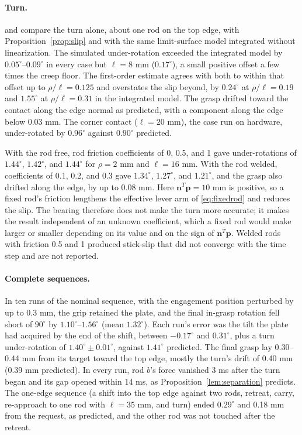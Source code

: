 

\paragraph{Turn.}
 and  compare the turn alone, about one rod on the top edge, with Proposition~\ref{prop:slip} and with the same limit-surface model integrated without linearization. The simulated under-rotation exceeded the integrated model by $0.05^{\circ}$--$0.09^{\circ}$ in every case but $\ell=8$ mm ($0.17^{\circ}$), a small positive offset a few times the creep floor. The first-order estimate agrees with both to within that offset up to $\rho/\ell=0.125$ and overstates the slip beyond, by $0.24^{\circ}$ at $\rho/\ell=0.19$ and $1.55^{\circ}$ at $\rho/\ell=0.31$ in the integrated model. The grasp drifted toward the contact along the edge normal as predicted, with a component along the edge below 0.03 mm. The corner contact ($\ell=20$ mm), the case run on hardware, under-rotated by $0.96^{\circ}$ against $0.90^{\circ}$ predicted.





With the rod free, rod friction coefficients of 0, 0.5, and 1 gave under-rotations of $1.44^{\circ}$, $1.42^{\circ}$, and $1.44^{\circ}$ for $\rho=2$ mm and $\ell=16$ mm. With the rod welded, coefficients of 0.1, 0.2, and 0.3 gave $1.34^{\circ}$, $1.27^{\circ}$, and $1.21^{\circ}$, and the grasp also drifted along the edge, by up to 0.08 mm. Here $\mathbf n^T\mathbf p=10$ mm is positive, so a fixed rod's friction lengthens the effective lever arm of \eqref{eq:fixedrod} and reduces the slip. The bearing therefore does not make the turn more accurate; it makes the result independent of an unknown coefficient, which a fixed rod would make larger or smaller depending on its value and on the sign of $\mathbf n^T\mathbf p$. Welded rods with friction 0.5 and 1 produced stick-slip that did not converge with the time step and are not reported.

\paragraph{Complete sequences.}
In ten runs of the nominal sequence, with the engagement position perturbed by up to 0.3 mm, the grip retained the plate, and the final in-grasp rotation fell short of $90^{\circ}$ by $1.10^{\circ}$--$1.56^{\circ}$ (mean $1.32^{\circ}$). Each run's error was the tilt the plate had acquired by the end of the shift, between $-0.17^{\circ}$ and $0.31^{\circ}$, plus a turn under-rotation of $1.40^{\circ}\pm0.01^{\circ}$, against $1.41^{\circ}$ predicted. The final grasp lay 0.30--0.44 mm from its target toward the top edge, mostly the turn's drift of 0.40 mm (0.39 mm predicted). In every run, rod $b$'s force vanished 3 ms after the turn began and its gap opened within 14 ms, as Proposition~\ref{lem:separation} predicts. The one-edge sequence (a shift into the top edge against two rods, retreat, carry, re-approach to one rod with $\ell=35$ mm, and turn) ended $0.29^{\circ}$ and 0.18 mm from the request, as predicted, and the other rod was not touched after the retreat.

